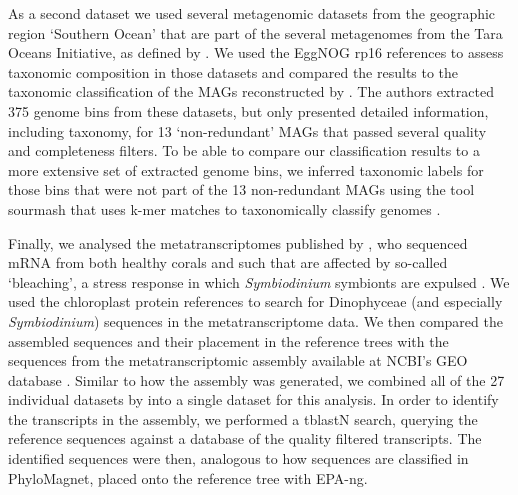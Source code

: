 \documentclass{bioinfo}
\begin{document}
\begin{methods}
As a second dataset we used several metagenomic datasets from the geographic region ‘Southern Ocean’ that are part of the several metagenomes from the Tara Oceans Initiative, as defined by \cite{Delmont2018}. We used the EggNOG rp16 references to assess taxonomic composition in those datasets and compared the results to the taxonomic classification of the MAGs reconstructed by \cite{Delmont2018}. The authors extracted 375 genome bins from these datasets, but only presented detailed information, including taxonomy, for 13 ‘non-redundant’ MAGs that passed several quality and completeness filters. To be able to compare our classification results to a more extensive set of extracted genome bins, we inferred taxonomic labels for those bins that were not part of the 13 non-redundant MAGs using the tool sourmash that uses k-mer matches to taxonomically classify genomes \citep{TitusBrown2016}.

Finally, we analysed the metatranscriptomes published by \citet{Frazier2017}, who sequenced mRNA from both healthy corals and such that are affected by so-called ‘bleaching’, a stress response in which \textit{Symbiodinium} symbionts are expulsed \citep{Howe2008}. We used the chloroplast protein references to search for Dinophyceae (and especially \textit{Symbiodinium}) sequences in the metatranscriptome data. We then compared the assembled sequences and their placement in the reference trees with the sequences from the metatranscriptomic assembly available at NCBI’s GEO database \citep{Barrett2012}. Similar to how the assembly was generated, we combined all of the 27 individual datasets by \citet{Frazier2017} into a single dataset for this analysis. In order to identify the transcripts in the assembly, we performed a tblastN search, querying the reference sequences against a database of the quality filtered transcripts. The identified sequences were then, analogous to how sequences are classified in PhyloMagnet, placed onto the reference tree with EPA-ng. 


\end{methods}
\end{document}
